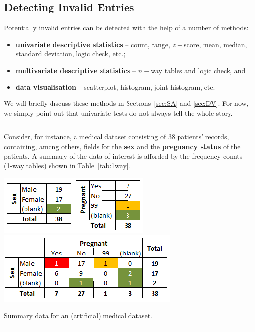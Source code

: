 \subsection{Detecting Invalid Entries}
Potentially invalid entries can be detected with the help of a number of methods: 
\begin{itemize}[noitemsep]
    \item \textbf{univariate descriptive statistics} -- count, range, $z-$score, mean, median, standard deviation, logic check, etc.;
    \item \textbf{multivariate descriptive statistics} -- $n-$way tables and logic check, and \item \textbf{data visualisation} -- scatterplot, histogram, joint histogram, etc.
\end{itemize} 
We will briefly discuss these methods in Sections~\ref{sec:SA} and \ref{sec:DV}. For now, we simply point out that univariate tests do not always tell the whole story. 
\begin{center}
    \rule{0.5\textwidth}{.4pt}
\end{center}
Consider, for instance, a medical dataset consisting of 38 patients' records, containing, among others, fields for the \textbf{sex} and the \textbf{pregnancy status} of the patients. A summary of the data of interest is afforded by the frequency counts (1-way tables) shown in Table~\ref{tab:1way}.
\begin{table}[t]
       \centering
 \includegraphics[width=\textwidth]{Images/med_sex_preg}
\includegraphics[width=\textwidth]{Images/med_2_way}
\caption{\small Summary data for an (artificial) medical dataset.}\hrule
        \label{tab:med_data}
\end{table}

